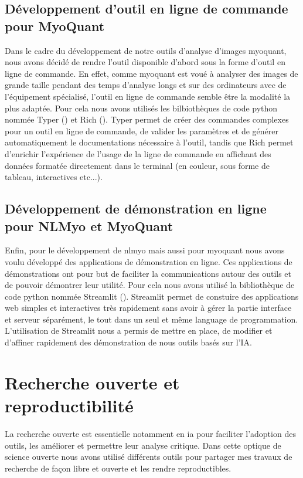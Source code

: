 \subsection{Développement d'outil en ligne de commande pour MyoQuant}
Dans le cadre du développement de notre outils d'analyse d'images \gls{myoquant}, nous avons décidé de rendre l'outil disponible d'abord sous la forme d'outil en ligne de commande. En effet, comme \gls{myoquant} est voué à analyser des images de grande taille pendant des temps d'analyse longs et sur des ordinateurs avec de l'équipement spécialisé, l'outil en ligne de commande semble être la modalité la plus adaptée. Pour cela nous avons utilisés les bilbiothèques de code python nommée Typer (\cite{ramirez_typer_2019}) et Rich (\cite{will_mcgugan_rich_2020}). Typer permet de créer des commandes complexes pour un outil en ligne de commande, de valider les paramètres et de générer automatiquement le documentations nécessaire à l'outil, tandis que Rich permet d'enrichir l'expérience de l'usage de la ligne de commande en affichant des données formatée directement dans le terminal (en couleur, sous forme de tableau, interactives etc...).

\subsection{Développement de démonstration en ligne pour NLMyo et MyoQuant}
Enfin, pour le développement de \gls{nlmyo} mais aussi pour \gls{myoquant} nous avons voulu développé des applications de démonstration en ligne. Ces applications de démonstrations ont pour but de faciliter la communications autour des outils et de pouvoir démontrer leur utilité. Pour cela nous avons utilisé la bibliothèque de code python nommée Streamlit (\cite{adrien_treuille_streamlit_2018}). Streamlit permet de constuire des applications web simples et interactives très rapidement sans avoir à gérer la partie interface et serveur séparément, le tout dans un seul et même language de programmation. L'utilisation de Streamlit nous a permis de mettre en place, de modifier et d'affiner rapidement des démonstration de nous outils basés sur l'IA.

\section{Recherche ouverte et reproductibilité}
La recherche ouverte est essentielle notamment en \gls{ia} pour faciliter l'adoption des outils, les améliorer et permettre leur analyse critique. Dans cette optique de science ouverte nous avons utilisé différents outils pour partager mes travaux de recherche de façon libre et ouverte et les rendre reproductibles.

